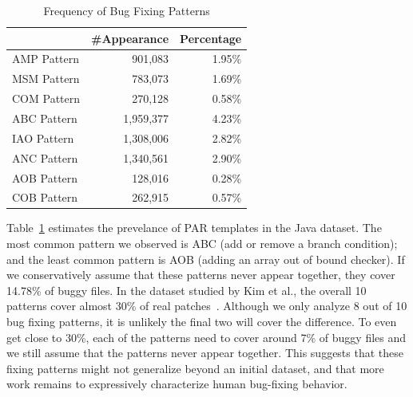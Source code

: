 \documentclass{sig-alternate-05-2015}
\begin{document}
\begin{table}[!htb]
	\centering
	\begin{tabular}{lrr} 
		\hline
		& \textbf{\#Appearance} & \textbf{Percentage}\\
		\hline
		AMP Pattern & 901,083 & 1.95\%\\
		MSM Pattern & 783,073 & 1.69\%\\
		COM Pattern & 270,128 & 0.58\%\\ 
		ABC Pattern & 1,959,377 & 4.23\%\\  
		IAO Pattern & 1,308,006 & 2.82\%\\  
		ANC Pattern & 1,340,561 & 2.90\%\\  
		AOB Pattern & 128,016 & 0.28\%\\  
		COB Pattern & 262,915 & 0.57\%\\   
		\hline
	\end{tabular}
	\caption{Frequency of Bug Fixing Patterns}\label{tab:freqpattern}
	
\end{table}


Table~\ref{tab:freqpattern} estimates the prevelance of PAR templates in the
Java dataset. The most common pattern we observed is ABC (add or remove a branch condition); and the least common
pattern is AOB (adding an array out of bound checker). If we conservatively assume that these patterns never appear together, they
cover 14.78\% of buggy files. In the dataset studied by Kim et al., the overall
10 patterns cover almost 30\% of real patches~\cite{kim2013}. Although we only analyze 8
out of 10 bug fixing patterns, it is unlikely the final two will cover the
difference. To even get close to 30\%, each of the patterns need to cover around 7\% of buggy files and we still assume that the patterns never appear together. 
This suggests that these fixing patterns might not generalize
beyond an initial dataset, and that more work remains to expressively characterize human bug-fixing behavior.
\end{document}
